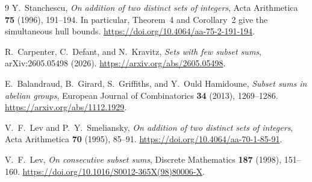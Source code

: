 \begin{thebibliography}{9}
\setlength{\itemsep}{0pt}
Y.~Stanchescu, \emph{On addition of two distinct sets of integers},
Acta Arithmetica \textbf{75} (1996), 191--194. In particular, Theorem~4
and Corollary~2 give the simultaneous hull bounds.
\url{https://doi.org/10.4064/aa-75-2-191-194}.

R.~Carpenter, C.~Defant, and N.~Kravitz,
\emph{Sets with few subset sums}, arXiv:2605.05498 (2026).
\url{https://arxiv.org/abs/2605.05498}.

E.~Balandraud, B.~Girard, S.~Griffiths, and Y.~Ould Hamidoune,
\emph{Subset sums in abelian groups},
European Journal of Combinatorics \textbf{34} (2013), 1269--1286.
\url{https://arxiv.org/abs/1112.1929}.

V.~F.~Lev and P.~Y.~Smeliansky,
\emph{On addition of two distinct sets of integers},
Acta Arithmetica \textbf{70} (1995), 85--91.
\url{https://doi.org/10.4064/aa-70-1-85-91}.

V.~F.~Lev, \emph{On consecutive subset sums},
Discrete Mathematics \textbf{187} (1998), 151--160.
\url{https://doi.org/10.1016/S0012-365X(98)80006-X}.

\end{thebibliography}
